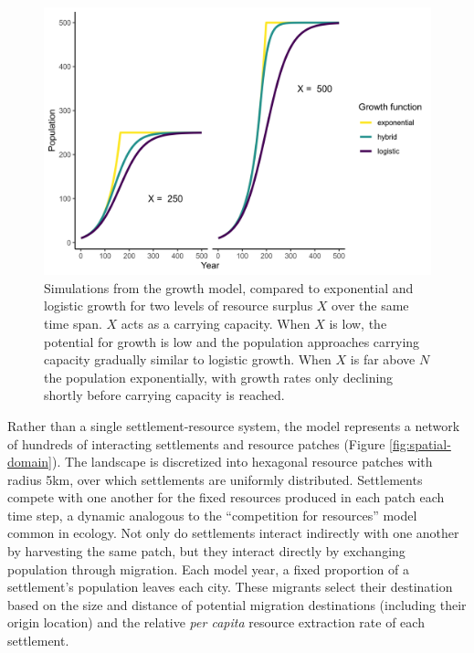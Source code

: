 \documentclass{article}
\begin{document}
\begin{figure}
    \centering
    \includegraphics[width=\columnwidth]{images/growth-models.png}
    \caption[Simulations from the growth model, compared to exponential and logistic growth for two levels of resources]{Simulations from the growth model, compared to exponential and logistic growth for two levels of resource surplus $X$ over the same time span. $X$ acts as a carrying capacity. When $X$ is low, the potential for growth is low and the population approaches carrying capacity gradually similar to logistic growth. When $X$ is far above $N$ the population exponentially, with growth rates only declining shortly before carrying capacity is reached.}
    \label{fig:growth-models}
\end{figure}

Rather than a single settlement-resource system, the model represents a network of hundreds of interacting settlements and resource patches (Figure \ref{fig:spatial-domain}). The landscape is discretized into hexagonal resource patches with radius 5km, over which settlements are uniformly distributed. Settlements compete with one another for the fixed resources produced in each patch each time step, a dynamic analogous to the ``competition for resources'' model common in ecology. Not only do settlements interact indirectly with one another by harvesting the same patch, but they interact directly by exchanging population through migration. Each model year, a fixed proportion of a settlement's population leaves each city. These migrants select their destination based on the size and distance of potential migration destinations (including their origin location) and the relative \emph{per capita} resource extraction rate of each settlement.
\end{document}
